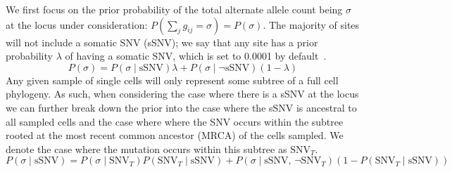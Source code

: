 \documentclass[../../main.tex]{subfiles}
\begin{document}
We first focus on the prior probability of the total alternate allele count being $\sigma$ at the locus under consideration: $P(\sum_j g_{ij}=\sigma)=P(\sigma)$.
The majority of sites will not include a somatic SNV (sSNV); we say that any site has a prior probability $\lambda$ of having a somatic SNV, which is set to 0.0001 by default~\cite{monovar, sciphi}.
\begin{equation} \label{eq:overallprior}
P(\sigma)=P(\sigma\mid\text{sSNV})\lambda+P(\sigma\mid\neg\text{sSNV})(1-\lambda)
\end{equation}
Any given sample of single cells will only represent some subtree of a full cell phylogeny.
As such, when considering the case where there is a sSNV at the locus we can further break down the prior into the case where the sSNV is ancestral to all sampled cells and the case where where the SNV occurs within the subtree rooted at the most recent common ancestor (MRCA) of the cells sampled.
We denote the case where the mutation occurs within this subtree as $\text{SNV}_T$.
\begin{equation} \label{eq:somaticsnv}
P(\sigma\mid\text{sSNV})=P(\sigma\mid \text{SNV}_T)P(\text{SNV}_T\mid \text{sSNV})+P(\sigma\mid \text{sSNV},\,\neg\text{SNV}_T)(1-P(\text{SNV}_T\mid \text{sSNV}))
\end{equation}
\end{document}
